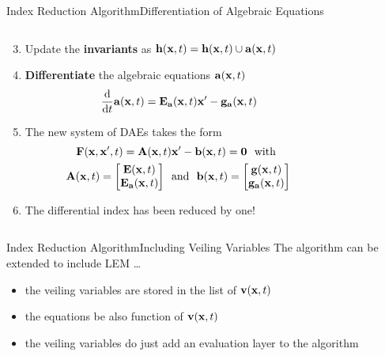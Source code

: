 \begin{frame}{Index Reduction Algorithm}{Differentiation of Algebraic Equations}
  \vspace{-1.5em}
  \begin{columns}
    \begin{column}[c]{0.6\textwidth}
      \begin{enumerate}[<+->]\setcounter{enumi}{2}
        \item Update the \textbf{invariants} as $\mathbf{h}(\mathbf{x}, t) = \mathbf{h}(\mathbf{x}, t) \cup \mathbf{a}(\mathbf{x}, t)$
        \item \textbf{Differentiate} the algebraic equations $\mathbf{a}(\mathbf{x}, t)$
        \begin{equation*}
          \dfrac{\text{d}}{\text{d}t} \mathbf{a}(\mathbf{x}, t) = \mathbf{E}_{\mathbf{a}}(\mathbf{x}, t) \mathbf{x}^\prime - \mathbf{g}_{\mathbf{a}}(\mathbf{x}, t)
        \end{equation*}
        \item The new system of \acsp{DAE} takes the form
        \begin{align*}
          \mathbf{F}(\mathbf{x}, \mathbf{x}^\prime, t) = \mathbf{A}(\mathbf{x}, t) &\mathbf{x}^\prime - \mathbf{b}(\mathbf{x}, t) = \mathbf{0} ~~ \text{with} \\
          \mathbf{A}(\mathbf{x}, t) = \begin{bmatrix} \mathbf{E}(\mathbf{x}, t) \\ \mathbf{E}_{\mathbf{a}}(\mathbf{x}, t) \end{bmatrix}
          ~~ &\text{and} ~~
          \mathbf{b}(\mathbf{x}, t) = \begin{bmatrix} \mathbf{g}(\mathbf{x}, t) \\ \mathbf{g}_{\mathbf{a}}(\mathbf{x}, t) \end{bmatrix}
        \end{align*}
        \item The differential index has been reduced by one!
      \end{enumerate}
    \end{column}
    \begin{column}[c]{0.4\textwidth}
    \end{column}
  \end{columns}
\end{frame}

\begin{frame}{Index Reduction Algorithm}{Including Veiling Variables}
  \vspace{-1.0em}
  The algorithm can be extended to include \acs{LEM} \dots
  \begin{itemize}
    \item the veiling variables are stored in the list of $\mathbf{v}(\mathbf{x}, t)$
    \item the equations be also function of $\mathbf{v}(\mathbf{x}, t)$
    \item the veiling variables do just add an evaluation layer to the algorithm
  \end{itemize}
\end{frame}


